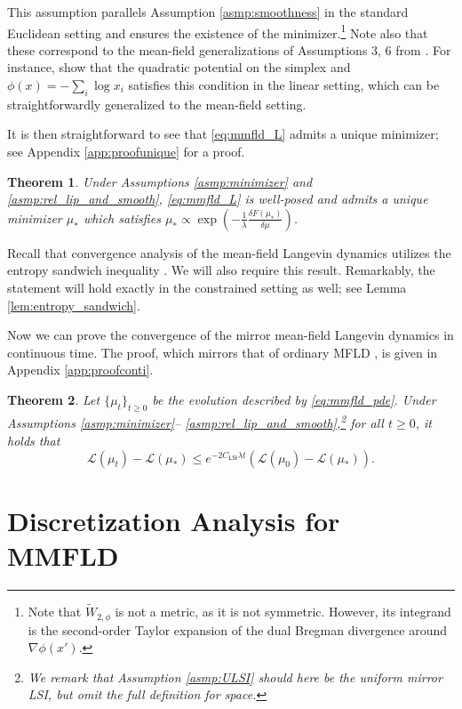 \documentclass{article}
\newtheorem{theorem}{Theorem}[section]
\newcommand{\CLSI}[0]{C_{\mathsf{LSI}}}
\begin{document}
This assumption parallels Assumption \ref{asmp:smoothness} in the standard Euclidean setting and ensures the existence of the minimizer.\footnote{Note that $\widetilde{W}_{2,\phi}$ is not a metric, as it is not symmetric. However, its integrand is the second-order Taylor expansion of the dual Bregman divergence around $\nabla\phi(x')$.} Note also that these correspond to the mean-field generalizations of Assumptions 3, 6 from \citet{jiang2021mirror}. For instance, \citet[Section E.2]{ahn2021efficient} show that the quadratic potential on the simplex and $\phi(x) = -\sum_{i}\log x_i$ satisfies this condition in the linear setting, which can be straightforwardly generalized to the mean-field setting.

It is then straightforward to see that \eqref{eq:mmfld_L} admits a unique minimizer; see Appendix \ref{app:proofunique} for a proof.
\begin{theorem}\label{thm:unique}
Under Assumptions \ref{asmp:minimizer} and \ref{asmp:rel_lip_and_smooth}, \eqref{eq:mmfld_L} is well-posed and admits a unique minimizer $\mu_*$ which satisfies $\mu_* \propto \exp\left(-\frac{1}{\lambda}\frac{\delta F(\mu_*)}{\delta\mu}\right)$.
\end{theorem}
Recall that convergence analysis of the mean-field Langevin dynamics utilizes the entropy sandwich inequality \citep{nitanda2022convex,chizat2022meanfield}. We will also require this result. Remarkably, the statement will hold exactly in the constrained setting as well; see Lemma \ref{lem:entropy_sandwich}.


Now we can prove the convergence of the mirror mean-field Langevin dynamics in continuous time. The proof, which mirrors that of ordinary MFLD \citep{nitanda2022convex}, is given in Appendix \ref{app:proofconti}.
\begin{theorem}\label{thm:mmfld_conti}
    Let $\{\mu_t\}_{t\ge0}$ be the evolution described by \eqref{eq:mmfld_pde}. Under Assumptions \ref{asmp:minimizer}-- \ref{asmp:rel_lip_and_smooth},\footnote{We remark that Assumption \ref{asmp:ULSI} should here be the uniform \emph{mirror} LSI, but omit the full definition for space.} for all $t\ge 0$, it holds that \[
    \mathcal{L}(\mu_t) - \mathcal{L}(\mu_*) \le e^{-2\CLSI \lambda t}(\mathcal{L}(\mu_0) - \mathcal{L}(\mu_*)).
    \]
\end{theorem}

\section{Discretization Analysis for MMFLD}\label{sec:discretized_analysis}
\end{document}

